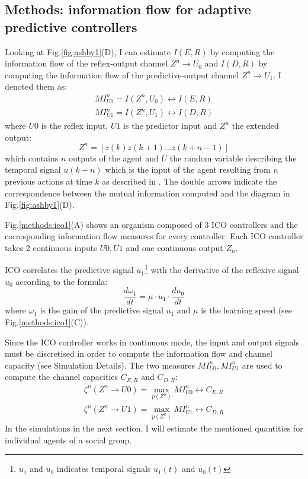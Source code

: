 \subsection{Methods: information flow for adaptive predictive controllers}
Looking at Fig.\ref{fig:ashby1}(D), I can estimate $I(E,R)$ by computing the
information flow of the reflex-output channel $Z^n \rightarrow  U_0$ and $I(D,R)$
by computing the information flow of the predictive-output channel $Z^n \rightarrow  U_1$.
I denoted them as:
\begin{eqnarray}
MI^n_{U0}=I(Z^n,U_0) \leftrightarrow I(E,R)\label{eq.mi0}\\
MI^n_{U1}=I(Z^n,U_1) \leftrightarrow I(D,R)\label{eq.mi1}
\end{eqnarray}
where $U0$ is the reflex input, $U1$ is the predictor input and
$Z^{n}$ the extended output:
\begin{equation}
Z^n=[z(k) z(k+1)\dots z(k+n-1)]
\end{equation}
which contains $n$ outputs of the agent and $U$ the random variable describing the
temporal signal $u(k+n)$ which is the input of the agent resulting from
$n$ previous actions at time $k$ as described in \citet{organizationInfo,quantifyInfo}.
The double arrows indicate the correspondence between the mutual information computed
and the diagram in Fig.\ref{fig:ashby1}(D).

Fig.\ref{methods:ico1}(A) shows an organism composed of 3 ICO \citep{Porr2006ICO}
controllers and the corresponding information flow measures for every controller.
Each ICO controller takes 2 continuous inputs $U0,U1$ and one continuous output $Z_{n}$.

ICO correlates the predictive signal $u_{1}$\footnote{$u_{1}$ and $u_{0}$ indicates
temporal signals $u_{1}(t)$ and $u_{0}(t)$} with the derivative of
the reflexive signal $u_{0}$ according to the formula:
\begin{equation}
 \frac{d\omega_1}{dt}=\mu \cdot u_1 \cdot \frac{du_0}{dt}
\end{equation}
where $\omega_1$ is the gain of the predictive signal $u_{1}$ and $\mu$ is the
learning speed (see Fig.\ref{methods:ico1}(C)).

Since the ICO controller works in continuous mode, the input and output signals
must be discretised in order to compute the information flow and channel capacity (see Simulation Details).
The two measures $MI^n_{U0},MI^n_{U1}$  are used to compute the channel capacities $C_{E,R}$ and $C_{D,R}$:
\begin{eqnarray}
\zeta^n(Z^n \rightarrow U0)=\max_{p(Z^n) } MI^n_{U0}  \leftrightarrow C_{E,R} \label{eq:c0}\\
\zeta^n(Z^n \rightarrow U1)=\max_{p(Z^n) } MI^n_{U1}   \leftrightarrow C_{D,R} \label{eq.c1}
\end{eqnarray}
In the simulations in the next section, I will estimate the mentioned quantities
for individual agents of a social group.

